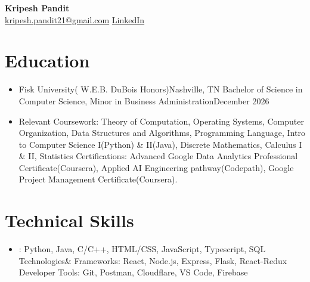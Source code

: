 \documentclass[12pt]{article} %
\begin{document}
\begin{center}
  \textbf{{\LARGE Kripesh Pandit}} \\[6pt]
   \hspace{3pt} \href{mailto:kripesh.pandit21@gmail.com}{kripesh.pandit21@gmail.com} \quad  \quad
  \faLinkedin \hspace{3pt} \href{https://www.linkedin.com/in/kripesh-pandit}{LinkedIn} \quad  \quad 
  \hspace{3pt}{615892-4468} \hspace{3pt}
\end{center}
\vspace{-12pt}


\section{Education}
\begin{itemize}
  \item Fisk University( W.E.B. DuBois Honors)Nashville, TN
    Bachelor of Science in Computer Science, Minor in Business AdministrationDecember 2026
  \item Relevant Coursework: Theory of Computation, Operating Systems, Computer Organization, Data Structures and Algorithms, Programming Language, Intro to Computer Science I(Python) \& II(Java), Discrete Mathematics, Calculus I \& II, Statistics 
 Certifications: Advanced Google Data Analytics Professional Certificate(Coursera), Applied AI Engineering pathway(Codepath), Google Project Management Certificate(Coursera).
\end{itemize}
\section{Technical Skills}
\begin{itemize}
  \item : Python, Java, C/C++, HTML/CSS, JavaScript, Typescript, SQL 
   Technologies\& Frameworks: React, Node.js, Express, Flask, React-Redux 
  Developer Tools: Git, Postman, Cloudflare, VS Code, Firebase
\end{itemize}
\end{document}
